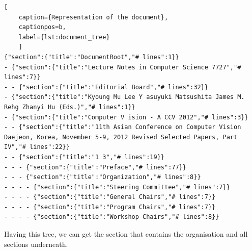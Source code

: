 \documentclass{ou-report}
\begin{document}
\begin{lstlisting}[
    caption={Representation of the document},
    captionpos=b,
    label={lst:document_tree}
    ]
{"section":{"title":"DocumentRoot","# lines":1}}
- {"section":{"title":"Lecture Notes in Computer Science 7727","# lines":7}}
- - {"section":{"title":"Editorial Board","# lines":32}}
- {"section":{"title":"Kyoung Mu Lee Y asuyuki Matsushita James M. Rehg Zhanyi Hu (Eds.)","# lines":1}}
- {"section":{"title":"Computer V ision - A CCV 2012","# lines":3}}
- - {"section":{"title":"11th Asian Conference on Computer Vision Daejeon, Korea, November 5-9, 2012 Revised Selected Papers, Part IV","# lines":22}}
- - {"section":{"title":"1 3","# lines":19}}
- - - {"section":{"title":"Preface","# lines":77}}
- - - {"section":{"title":"Organization","# lines":8}}
- - - - {"section":{"title":"Steering Committee","# lines":7}}
- - - - {"section":{"title":"General Chairs","# lines":7}}
- - - - {"section":{"title":"Program Chairs","# lines":7}}
- - - - {"section":{"title":"Workshop Chairs","# lines":8}}
\end{lstlisting}

Having this tree, we can get the section that contains the organisation
and all sections underneath.
\end{document}
